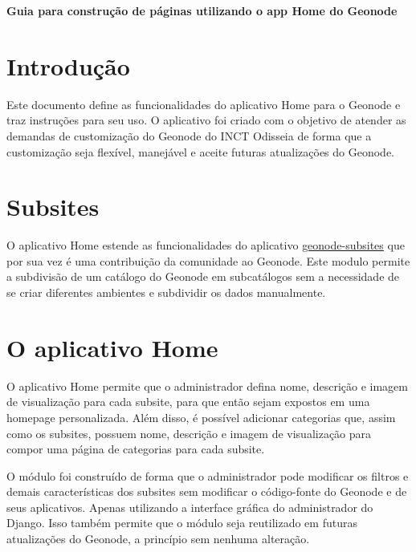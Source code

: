 \documentclass[12pt]{article}
\begin{document}
 


\begin{center}
  \vspace{12pt}
  \Large\textbf{Guia para construção de páginas utilizando o app Home do Geonode}
\end{center}

\section{Introdução}

Este documento define as funcionalidades do aplicativo Home para o Geonode e
traz instruções para seu uso. O aplicativo foi criado com o objetivo de atender
as demandas de customização do Geonode do INCT Odisseia de forma que a
customização seja flexível, manejável e aceite futuras atualizações do Geonode.

\section{Subsites} \label{sec:firstpage}

O aplicativo Home estende as funcionalidades do aplicativo \textcolor{blue}{
\href{https://github.com/geosolutions-it/geonode-subsites}{geonode-subsites}}
que por sua vez é uma contribuição da comunidade ao Geonode. Este modulo
permite a subdivisão de um catálogo do Geonode em subcatálogos sem a
necessidade de se criar diferentes ambientes e subdividir os dados manualmente.

\section{O aplicativo Home}

O aplicativo Home permite que o administrador defina nome, descrição e imagem
de visualização para cada subsite, para que então sejam expostos em uma
homepage personalizada. Além disso, é possível adicionar categorias que, assim
como os subsites, possuem nome, descrição e imagem de visualização para compor
uma página de categorias para cada subsite.

O módulo foi construído de forma que o administrador pode modificar os filtros
e demais características dos subsites sem modificar o código-fonte do Geonode e
de seus aplicativos. Apenas utilizando a interface gráfica do administrador do
Django. Isso também permite que o módulo seja reutilizado em futuras
atualizações do Geonode, a princípio sem nenhuma alteração.
\end{document}
